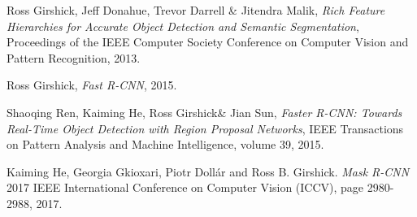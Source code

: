 \begin{thebibliography}{99}               %

 Ross Girshick, Jeff Donahue, Trevor Darrell \& Jitendra Malik, \textit{Rich Feature Hierarchies for Accurate Object Detection and Semantic Segmentation}, Proceedings of the IEEE Computer Society Conference on Computer Vision and Pattern Recognition, 2013.

 Ross Girshick, \textit{Fast R-CNN}, 2015.

 Shaoqing Ren, Kaiming He, Ross Girshick\& Jian Sun, \textit{Faster R-CNN: Towards Real-Time Object Detection with Region Proposal Networks}, IEEE Transactions on Pattern Analysis and Machine Intelligence, volume 39, 2015.

 Kaiming He, Georgia Gkioxari, Piotr Dollár and Ross B. Girshick. \textit{Mask R-CNN} 2017 IEEE International Conference on Computer Vision (ICCV), page 2980-2988, 2017.

\end{thebibliography}